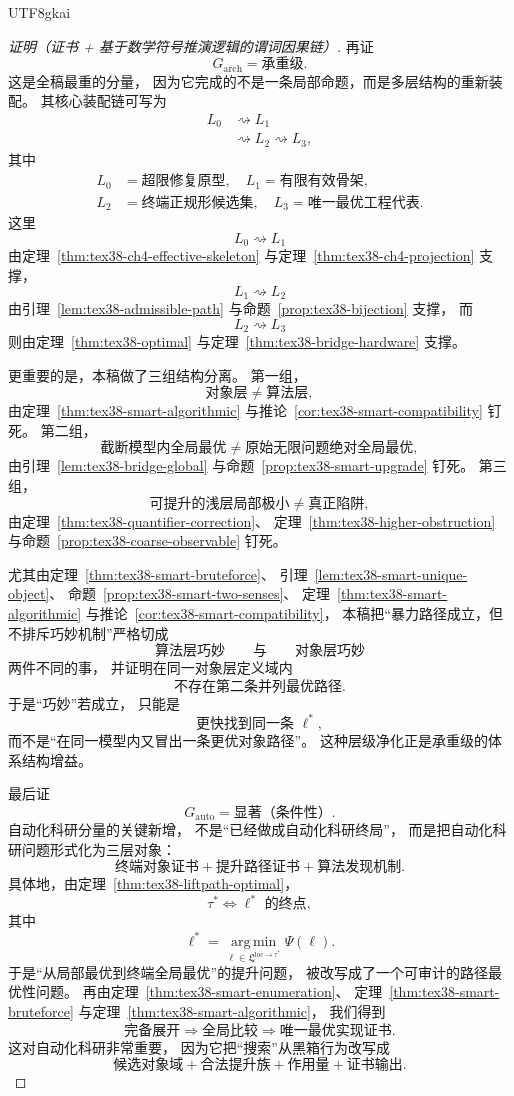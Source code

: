 \documentclass[12pt]{article}
\begin{document}
\begin{CJK*}{UTF8}{gkai}
\begin{proof}[证明（证书 + 基于数学符号推演逻辑的谓词因果链）]
再证
\[
  G_{\mathrm{arch}}=\text{承重级}.
\]
这是全稿最重的分量，
因为它完成的不是一条局部命题，而是多层结构的重新装配。
其核心装配链可写为
\[
  \begin{aligned}
    L_0
    &\rightsquigarrow
    L_1\\
    &\rightsquigarrow
    L_2
    \rightsquigarrow
    L_3,
  \end{aligned}
\]
其中
\[
  \begin{aligned}
    L_0&=\text{超限修复原型},\quad
    L_1=\text{有限有效骨架},\\
    L_2&=\text{终端正规形候选集},\quad
    L_3=\text{唯一最优工程代表}.
  \end{aligned}
\]
这里
\[
  L_0\rightsquigarrow L_1
\]
由定理~\ref{thm:tex38-ch4-effective-skeleton} 与定理~\ref{thm:tex38-ch4-projection} 支撑，
\[
  L_1\rightsquigarrow L_2
\]
由引理~\ref{lem:tex38-admissible-path} 与命题~\ref{prop:tex38-bijection} 支撑，
而
\[
  L_2\rightsquigarrow L_3
\]
则由定理~\ref{thm:tex38-optimal} 与定理~\ref{thm:tex38-bridge-hardware} 支撑。

更重要的是，本稿做了三组结构分离。
第一组，
\[
  \text{对象层}\neq\text{算法层},
\]
由定理~\ref{thm:tex38-smart-algorithmic} 与推论~\ref{cor:tex38-smart-compatibility} 钉死。
第二组，
\[
  \text{截断模型内全局最优}
  \neq
  \text{原始无限问题绝对全局最优},
\]
由引理~\ref{lem:tex38-bridge-global} 与命题~\ref{prop:tex38-smart-upgrade} 钉死。
第三组，
\[
  \text{可提升的浅层局部极小}
  \neq
  \text{真正陷阱},
\]
由定理~\ref{thm:tex38-quantifier-correction}、
定理~\ref{thm:tex38-higher-obstruction} 与命题~\ref{prop:tex38-coarse-observable} 钉死。

尤其由定理~\ref{thm:tex38-smart-bruteforce}、
引理~\ref{lem:tex38-smart-unique-object}、
命题~\ref{prop:tex38-smart-two-senses}、
定理~\ref{thm:tex38-smart-algorithmic} 与推论~\ref{cor:tex38-smart-compatibility}，
本稿把“暴力路径成立，但不排斥巧妙机制”严格切成
\[
  \text{算法层巧妙}
  \qquad\text{与}\qquad
  \text{对象层巧妙}
\]
两件不同的事，
并证明在同一对象层定义域内
\[
  \text{不存在第二条并列最优路径}.
\]
于是“巧妙”若成立，
只能是
\[
  \text{更快找到同一条 }\ell^\ast,
\]
而不是“在同一模型内又冒出一条更优对象路径”。
这种层级净化正是承重级的体系结构增益。

最后证
\[
  G_{\mathrm{auto}}=\text{显著（条件性）}.
\]
自动化科研分量的关键新增，
不是“已经做成自动化科研终局”，
而是把自动化科研问题形式化为三层对象：
\[
  \text{终端对象证书}
  +
  \text{提升路径证书}
  +
  \text{算法发现机制}.
\]
具体地，由定理~\ref{thm:tex38-liftpath-optimal}，
\[
  \tau^\ast
  \Longleftrightarrow
  \ell^\ast\text{ 的终点},
\]
其中
\[
  \ell^\ast
  =
  \operatorname*{arg\,min}_{\ell\in\mathfrak L^{\mathrm{loc}\to\tau^\ast}}
  \Psi(\ell).
\]
于是“从局部最优到终端全局最优”的提升问题，
被改写成了一个可审计的路径最优性问题。
再由定理~\ref{thm:tex38-smart-enumeration}、
定理~\ref{thm:tex38-smart-bruteforce} 与定理~\ref{thm:tex38-smart-algorithmic}，
我们得到
\[
  \text{完备展开}
  \Rightarrow
  \text{全局比较}
  \Rightarrow
  \text{唯一最优实现证书}.
\]
这对自动化科研非常重要，
因为它把“搜索”从黑箱行为改写成
\[
  \text{候选对象域}
  +
  \text{合法提升族}
  +
  \text{作用量}
  +
  \text{证书输出}.
\]


\end{proof}
\end{CJK*}
\end{document}
